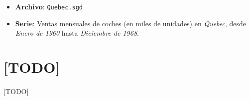 \documentclass[a4paper, spanish]{article}
\begin{document}
  \maketitle

  \begin{itemize}
    \item \textbf{Archivo}: \texttt{Quebec.sgd}
    \item \textbf{Serie}: Ventas mensuales de coches (en miles de unidades) en \emph{Quebec}, desde \emph{Enero de 1960} hasta \emph{Diciembre de 1968}.
  \end{itemize}

  \section{[TODO]}

    \paragraph{}
    [TODO]
\end{document}
